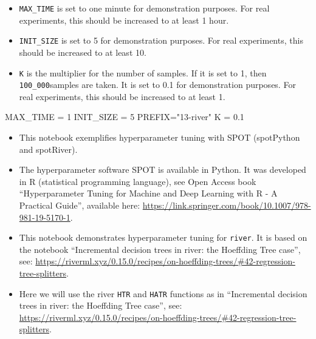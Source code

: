 \documentclass[
  letterpaper,
  DIV=11,
  numbers=noendperiod]{scrreprt}
\newenvironment{Shaded}{\begin{snugshade}}{\end{snugshade}}
\newcommand{\DecValTok}[1]{\textcolor[rgb]{0.68,0.00,0.00}{#1}}
\newcommand{\FloatTok}[1]{\textcolor[rgb]{0.68,0.00,0.00}{#1}}
\newcommand{\NormalTok}[1]{\textcolor[rgb]{0.00,0.23,0.31}{#1}}
\newcommand{\OperatorTok}[1]{\textcolor[rgb]{0.37,0.37,0.37}{#1}}
\newcommand{\StringTok}[1]{\textcolor[rgb]{0.13,0.47,0.30}{#1}}
\providecommand{\tightlist}{%
  \setlength{\itemsep}{0pt}\setlength{\parskip}{0pt}}\usepackage{longtable,booktabs,array}
\begin{document}
\begin{tcolorbox}[enhanced jigsaw, rightrule=.15mm, opacityback=0, colframe=quarto-callout-caution-color-frame, opacitybacktitle=0.6, toptitle=1mm, arc=.35mm, colbacktitle=quarto-callout-caution-color!10!white, coltitle=black, toprule=.15mm, leftrule=.75mm, titlerule=0mm, title=\textcolor{quarto-callout-caution-color}{\faFire}\hspace{0.5em}{Caution: Run time and initial design size should be increased for real
experiments}, bottomrule=.15mm, breakable, bottomtitle=1mm, left=2mm, colback=white]

\begin{itemize}
\tightlist
\item
  \texttt{MAX\_TIME} is set to one minute for demonstration purposes.
  For real experiments, this should be increased to at least 1 hour.
\item
  \texttt{INIT\_SIZE} is set to 5 for demonstration purposes. For real
  experiments, this should be increased to at least 10.
\item
  \texttt{K} is the multiplier for the number of samples. If it is set
  to 1, then \texttt{100\_000}samples are taken. It is set to 0.1 for
  demonstration purposes. For real experiments, this should be increased
  to at least 1.
\end{itemize}

\end{tcolorbox}

\begin{Shaded}
\begin{Highlighting}[]
\NormalTok{MAX\_TIME }\OperatorTok{=} \DecValTok{1}
\NormalTok{INIT\_SIZE }\OperatorTok{=} \DecValTok{5}
\NormalTok{PREFIX}\OperatorTok{=}\StringTok{"13{-}river"}
\NormalTok{K }\OperatorTok{=} \FloatTok{0.1}
\end{Highlighting}
\end{Shaded}

\begin{itemize}
\tightlist
\item
  This notebook exemplifies hyperparameter tuning with SPOT (spotPython
  and spotRiver).
\item
  The hyperparameter software SPOT is available in Python. It was
  developed in R (statistical programming language), see Open Access
  book ``Hyperparameter Tuning for Machine and Deep Learning with R - A
  Practical Guide'', available here:
  \url{https://link.springer.com/book/10.1007/978-981-19-5170-1}.
\item
  This notebook demonstrates hyperparameter tuning for \texttt{river}.
  It is based on the notebook ``Incremental decision trees in river: the
  Hoeffding Tree case'', see:
  \url{https://riverml.xyz/0.15.0/recipes/on-hoeffding-trees/\#42-regression-tree-splitters}.
\item
  Here we will use the river \texttt{HTR} and \texttt{HATR} functions as
  in ``Incremental decision trees in river: the Hoeffding Tree case'',
  see:
  \url{https://riverml.xyz/0.15.0/recipes/on-hoeffding-trees/\#42-regression-tree-splitters}.
\end{itemize}
\end{document}
